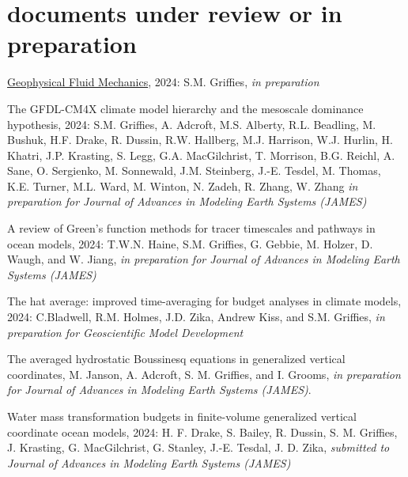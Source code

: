 \section*{\sc \color{Maroon} documents under review or in preparation}

\small 

\begin{etaremune}

\item \href{https://stephengriffies.github.io/assets/pdfs/GFM_lectures.pdf}{Geophysical Fluid Mechanics}, 2024: S.M. Grif\/f\/ies, {\it in preparation}

\item The GFDL-CM4X climate model hierarchy and the mesoscale dominance hypothesis, 2024: S.M. Grif\/f\/ies, A. Adcroft, M.S. Alberty, R.L. Beadling, M. Bushuk, H.F. Drake, R. Dussin, R.W. Hallberg, M.J. Harrison, W.J. Hurlin, H. Khatri, J.P. Krasting, S. Legg, G.A. MacGilchrist, T. Morrison, B.G. Reichl, A. Sane, O. Sergienko, M. Sonnewald,  J.M. Steinberg, J.-E. Tesdel, M. Thomas, K.E. Turner, M.L. Ward, M. Winton, N. Zadeh, R. Zhang, W. Zhang {\it in preparation for Journal of Advances in Modeling Earth Systems (JAMES)}

\item A review of Green's function methods for tracer timescales and pathways in ocean models, 2024: T.W.N. Haine, S.M. Grif\/f\/ies, G. Gebbie, M. Holzer, D. Waugh, and W. Jiang, {\it in preparation for Journal of Advances in Modeling Earth Systems (JAMES)}

\item The hat average: improved time-averaging for budget analyses in climate models, 2024: C.Bladwell,  R.M. Holmes, J.D. Zika, Andrew Kiss, and S.M. Grif\/f\/ies, {\it in preparation for Geoscientific Model Development}

\item The averaged hydrostatic Boussinesq equations in generalized vertical coordinates, M. Janson, A. Adcroft, S. M. Grif\/f\/ies, and I. Grooms, {\it in preparation for Journal of Advances in Modeling Earth Systems (JAMES)}. 

\item Water mass transformation budgets in finite-volume generalized vertical coordinate ocean models, 2024: H. F. Drake, S. Bailey, R. Dussin, S. M. Griffies, J. Krasting, G. MacGilchrist, G. Stanley, J.-E. Tesdal, J. D. Zika, {\it submitted to Journal of Advances in Modeling Earth Systems (JAMES)}


\end{etaremune}
